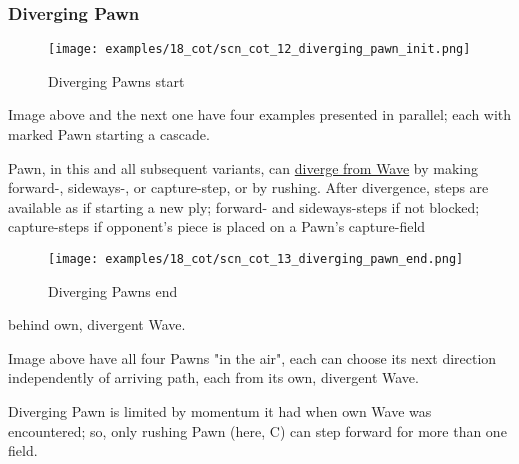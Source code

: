 \clearpage %

\subsubsection*{Diverging Pawn}
\label{sec:Conquest of Tlalocan/Shaman/Divergence/Diverging Pawn/2} %

\vspace*{-1.4\baselineskip}
\noindent
\begin{figure}[!h]
\texttt{[image: examples/18\_cot/scn\_cot\_12\_diverging\_pawn\_init.png]}
\vspace*{-1.3\baselineskip}
\caption{Diverging Pawns start}
\label{fig:scn_cot_12_diverging_pawn_init}
\end{figure}

\vspace*{-0.4\baselineskip}
Image above and the next one have four examples presented in parallel; each with
marked Pawn starting a cascade.

Pawn, in this and all subsequent variants, can
\hyperref[fig:scn_cot_11_diverging_pawn]{diverge from Wave} by making forward-,
sideways-, or capture-step, or by rushing. After divergence, steps are available as
if starting a new ply; forward- and sideways-steps if not blocked; capture-steps if
opponent's piece is placed on a Pawn's capture-field

\clearpage %

\vspace*{-2.1\baselineskip}
\noindent
\begin{figure}[!h]
\texttt{[image: examples/18\_cot/scn\_cot\_13\_diverging\_pawn\_end.png]}
\vspace*{-1.3\baselineskip}
\caption{Diverging Pawns end}
\label{fig:scn_cot_13_diverging_pawn_end}
\end{figure}

\vspace*{-0.4\baselineskip}
\noindent
behind own, divergent Wave.

Image above have all four Pawns "in the air", each can choose its next direction
independently of arriving path, each from its own, divergent Wave.

Diverging Pawn is limited by momentum it had when own Wave was encountered;
so, only rushing Pawn (here, C) can step forward for more than one field.

